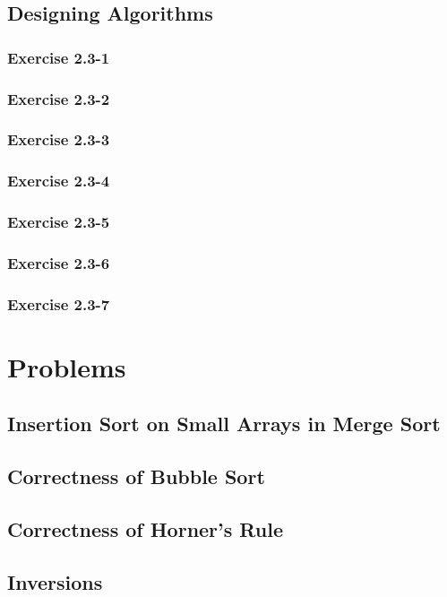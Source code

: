 \documentclass{article}
\begin{document}
\subsection {Designing Algorithms}
\subsubsection {Exercise 2.3-1}

\subsubsection {Exercise 2.3-2}

\subsubsection {Exercise 2.3-3}

\subsubsection {Exercise 2.3-4}

\subsubsection {Exercise 2.3-5}

\subsubsection {Exercise 2.3-6}

\subsubsection {Exercise 2.3-7}


\section {Problems}
\subsection {Insertion Sort on Small Arrays in Merge Sort}

\subsection {Correctness of Bubble Sort}

\subsection {Correctness of Horner's Rule}

\subsection {Inversions}
\end{document}
